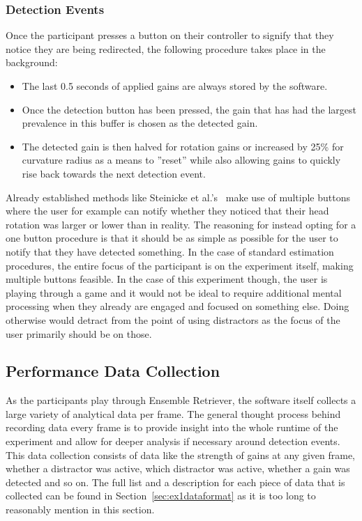 \subsubsection{Detection Events}
Once the participant presses a button on their controller to signify that they notice they are being redirected, the following procedure takes place in the background:

\begin{itemize}
    \item The last 0.5 seconds of applied gains are always stored by the software.
    \item Once the detection button has been pressed, the gain that has had the largest prevalence in this buffer is chosen as the detected gain. 
    \item The detected gain is then halved for rotation gains or increased by 25\% for curvature radius as a means to ''reset'' while also allowing gains to quickly rise back towards the next detection event.
\end{itemize}

Already established methods like Steinicke et al.'s~\cite{5072212} make use of multiple buttons where the user for example can notify whether they noticed that their head rotation was larger or lower than in reality. The reasoning for instead opting for a one button procedure is that it should be as simple as possible for the user to notify that they have detected something. In the case of standard estimation procedures, the entire focus of the participant is on the experiment itself, making multiple buttons feasible. In the case of this experiment though, the user is playing through a game and it would not be ideal to require additional mental processing when they already are engaged and focused on something else. Doing otherwise would detract from the point of using distractors as the focus of the user primarily should be on those. 

\subsection{Performance Data Collection}
As the participants play through Ensemble Retriever, the software itself collects a large variety of analytical data per frame. The general thought process behind recording data every frame is to provide insight into the whole runtime of the experiment and allow for deeper analysis if necessary around detection events. This data collection consists of data like the strength of gains at any given frame, whether a distractor was active, which distractor was active, whether a gain was detected and so on. The full list and a description for each piece of data that is collected can be found in Section~\ref{sec:ex1dataformat} as it is too long to reasonably mention in this section.

